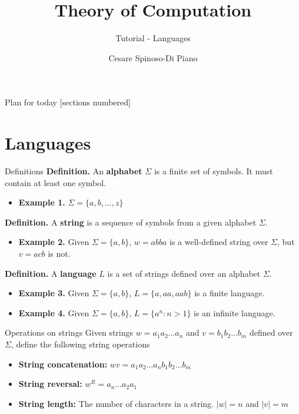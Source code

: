 \documentclass[10pt]{beamer}
\title{Theory of Computation}
\subtitle{Tutorial - Languages}
\author{Cesare Spinoso-Di Piano}
\date{}
\begin{document}
\maketitle

\begin{frame}{Plan for today}
    [sections numbered]
    \tableofcontents[hideallsubsections]
\end{frame}

\section{Languages}

\begin{frame}{Definitions}
    \textbf{Definition.} An \textbf{alphabet} $\Sigma$ is a finite set of symbols. It must contain at least one symbol.
    \begin{itemize}
        \item \textbf{Example 1.} $\Sigma = \{a,b,...,z\}$
    \end{itemize}
    \textbf{Definition.} A \textbf{string} is a sequence of symbols from a given alphabet $\Sigma$.
    \begin{itemize}
        \item \textbf{Example 2.} Given $\Sigma = \{a,b\}$, $w = abba$ is a well-defined string over $\Sigma$, but $v = acb$ is not. %
    \end{itemize}
    \textbf{Definition.} A \textbf{language} $L$ is a set of strings defined over an alphabet $\Sigma$.
    \begin{itemize}[itemsep=5mm, parsep=0pt]
        \item \textbf{Example 3.} Given $\Sigma=\{a,b\}$, $L=\{a,aa,aab\}$ is a finite language.
        \item \textbf{Example 4.} Given $\Sigma=\{a,b\}$, $L=\{a^n : n > 1\}$ is an infinite language.
    \end{itemize}
\end{frame}
\begin{frame}{Operations on strings}
    Given strings $w = a_1a_2\dots a_n$ and $v = b_1b_2 \dots b_m$ defined over $\Sigma$, define the following string operations
    \begin{itemize}[itemsep=5mm, parsep=0pt]
        \item \textbf{String concatenation: } $ wv = a_1a_2\dots a_n b_1b_2 \dots b_m$
        \item \textbf{String reversal: } $w^R = a_n \dots a_2a_1$
        \item \textbf{String length: }The number of characters in a string. $|w| = n$ and $|v| = m$

    \end{itemize}
\end{frame}
\end{document}
